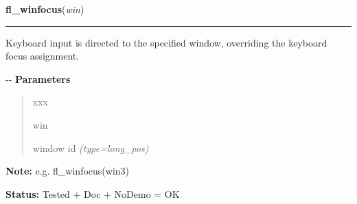 \hspace{.8\funcindent}\begin{boxedminipage}{\funcwidth}

    \raggedright \textbf{fl\_winfocus}(\textit{win})

    \vspace{-1.5ex}

    \rule{\textwidth}{0.5\fboxrule}
\setlength{\parskip}{2ex}

Keyboard input is directed to the specified window, overriding the
keyboard focus assignment.

-{}-
\setlength{\parskip}{1ex}
      \textbf{Parameters}
      \vspace{-1ex}

      \begin{quote}
        \begin{Ventry}{xxx}

          \item[win]


window id
            {\it (type=long\_pos)}

        \end{Ventry}

      \end{quote}

\textbf{Note:} 
e.g. fl\_winfocus(win3)


\textbf{Status:} 
Tested + Doc + NoDemo = OK


    \end{boxedminipage}

    \label{xformslib:flxbasic:fl_winget}

    \vspace{0.5ex}

